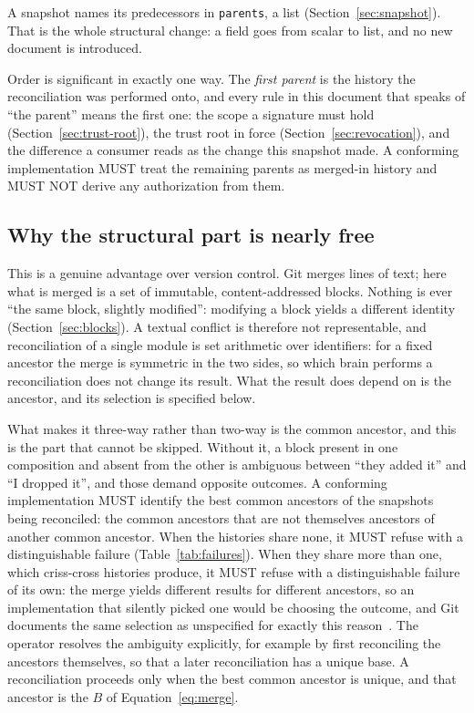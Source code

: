 \documentclass[11pt,a4paper]{article}
\begin{document}
A snapshot names its predecessors in \texttt{parents}, a list
(Section~\ref{sec:snapshot}). That is the whole structural change: a field goes from scalar to list, and no
new document is introduced.

Order is significant in exactly one way. The \emph{first parent} is the history
the reconciliation was performed onto, and every rule in this document that
speaks of ``the parent'' means the first one: the scope a signature must hold
(Section~\ref{sec:trust-root}), the trust root in force
(Section~\ref{sec:revocation}), and the difference a consumer reads as the
change this snapshot made. A conforming implementation MUST treat the remaining
parents as merged-in history and MUST NOT derive any authorization from them.

\subsection{Why the structural part is nearly free}
\label{sec:set-merge}

This is a genuine advantage over version control. Git merges lines of text;
here what is merged is a set of immutable, content-addressed blocks. Nothing is ever ``the same block, slightly modified'':
modifying a block yields a different identity (Section~\ref{sec:blocks}). A textual conflict is therefore not representable, and reconciliation of a
single module is set arithmetic over identifiers: for a fixed ancestor the
merge is symmetric in the two sides, so which brain performs a reconciliation
does not change its result. What the result does depend on is the ancestor,
and its selection is specified below.

What makes it three-way rather than two-way is the common ancestor, and this is
the part that cannot be skipped. Without it, a block present in one composition
and absent from the other is ambiguous between ``they added it'' and ``I dropped
it'', and those demand opposite outcomes. A conforming implementation MUST identify the best common ancestors of the
snapshots being reconciled: the common ancestors that are not themselves
ancestors of another common ancestor. When the histories share none, it MUST
refuse with a distinguishable failure (Table~\ref{tab:failures}). When they
share more than one, which criss-cross histories produce, it MUST refuse with
a distinguishable failure of its own: the merge yields different results for
different ancestors, so an implementation that silently picked one would be
choosing the outcome, and Git documents the same selection as unspecified for
exactly this reason~\cite{gitmergebase}. The operator resolves the ambiguity
explicitly, for example by first reconciling the ancestors themselves, so that
a later reconciliation has a unique base. A reconciliation proceeds only when
the best common ancestor is unique, and that ancestor is the $B$ of
Equation~\ref{eq:merge}.
\end{document}
